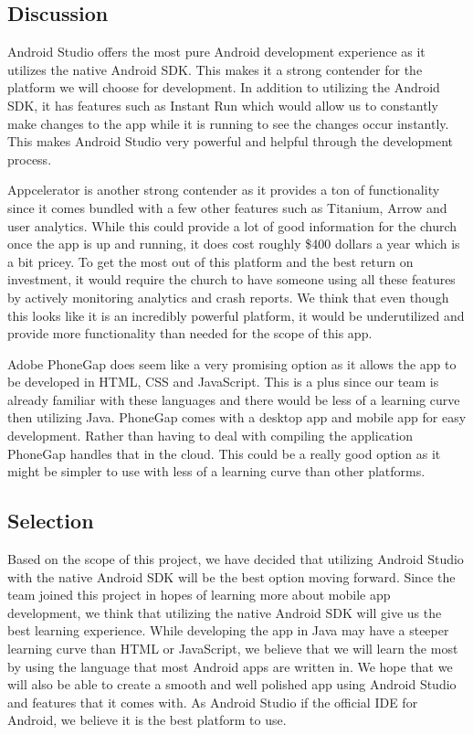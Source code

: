 \documentclass[letterpaper,10pt,draftclsnofoot,onecolumn,titlepage]{IEEEtran}
\begin{document}
		\subsection{Discussion}
			Android Studio offers the most pure Android development experience as it utilizes the native Android SDK.
			This makes it a strong contender for the platform we will choose for development.
			In addition to utilizing the Android SDK, it has features such as Instant Run which would allow us to constantly make changes to the app while it is running to see the changes occur instantly.
			This makes Android Studio very powerful and helpful through the development process.

			Appcelerator is another strong contender as it provides a ton of functionality since it comes bundled with a few other features such as Titanium, Arrow and user analytics.
			While this could provide a lot of good information for the church once the app is up and running, it does cost roughly \$400 dollars a year which is a bit pricey.
			To get the most out of this platform and the best return on investment, it would require the church to have someone using all these features by actively monitoring analytics and crash reports.
			We think that even though this looks like it is an incredibly powerful platform, it would be underutilized and provide more functionality than needed for the scope of this app.

			Adobe PhoneGap does seem like a very promising option as it allows the app to be developed in HTML, CSS and JavaScript.
			This is a plus since our team is already familiar with these languages and there would be less of a learning curve then utilizing Java.
			PhoneGap comes with a desktop app and mobile app for easy development.
			Rather than having to deal with compiling the application PhoneGap handles that in the cloud.
			This could be a really good option as it might be simpler to use with less of a learning curve than other platforms.

		\subsection{Selection}
			Based on the scope of this project, we have decided that utilizing Android Studio with the native Android SDK will be the best option moving forward.
			Since the team joined this project in hopes of learning more about mobile app development, we think that utilizing the native Android SDK will give us the best learning experience.
			While developing the app in Java may have a steeper learning curve than HTML or JavaScript, we believe that we will learn the most by using the language that most Android apps are written in.
			We hope that we will also be able to create a smooth and well polished app using Android Studio and features that it comes with.
			As Android Studio if the official IDE for Android, we believe it is the best platform to use.
\end{document}
